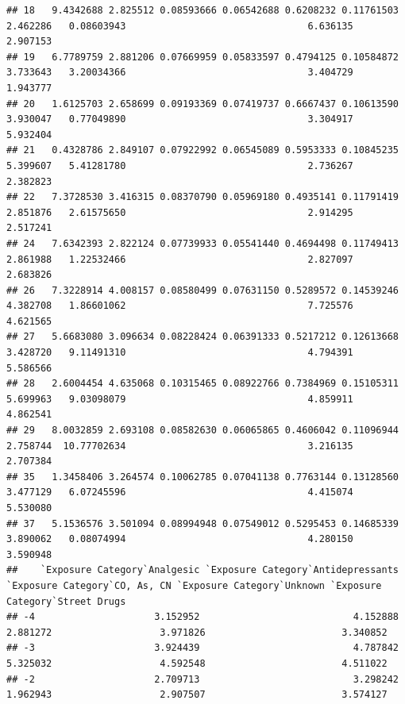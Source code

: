 \documentclass[
]{article}
\begin{document}
\begin{verbatim}
## 18   9.4342688 2.825512 0.08593666 0.06542688 0.6208232 0.11761503                       2.462286   0.08603943                                6.636135       2.907153
## 19   6.7789759 2.881206 0.07669959 0.05833597 0.4794125 0.10584872                       3.733643   3.20034366                                3.404729       1.943777
## 20   1.6125703 2.658699 0.09193369 0.07419737 0.6667437 0.10613590                       3.930047   0.77049890                                3.304917       5.932404
## 21   0.4328786 2.849107 0.07922992 0.06545089 0.5953333 0.10845235                       5.399607   5.41281780                                2.736267       2.382823
## 22   7.3728530 3.416315 0.08370790 0.05969180 0.4935141 0.11791419                       2.851876   2.61575650                                2.914295       2.517241
## 24   7.6342393 2.822124 0.07739933 0.05541440 0.4694498 0.11749413                       2.861988   1.22532466                                2.827097       2.683826
## 26   7.3228914 4.008157 0.08580499 0.07631150 0.5289572 0.14539246                       4.382708   1.86601062                                7.725576       4.621565
## 27   5.6683080 3.096634 0.08228424 0.06391333 0.5217212 0.12613668                       3.428720   9.11491310                                4.794391       5.586566
## 28   2.6004454 4.635068 0.10315465 0.08922766 0.7384969 0.15105311                       5.699963   9.03098079                                4.859911       4.862541
## 29   8.0032859 2.693108 0.08582630 0.06065865 0.4606042 0.11096944                       2.758744  10.77702634                                3.216135       2.707384
## 35   1.3458406 3.264574 0.10062785 0.07041138 0.7763144 0.13128560                       3.477129   6.07245596                                4.415074       5.530080
## 37   5.1536576 3.501094 0.08994948 0.07549012 0.5295453 0.14685339                       3.890062   0.08074994                                4.280150       3.590948
##    `Exposure Category`Analgesic `Exposure Category`Antidepressants `Exposure Category`CO, As, CN `Exposure Category`Unknown `Exposure Category`Street Drugs
## -4                     3.152952                           4.152888                      2.881272                   3.971826                        3.340852
## -3                     3.924439                           4.787842                      5.325032                   4.592548                        4.511022
## -2                     2.709713                           3.298242                      1.962943                   2.907507                        3.574127

\end{verbatim}
\end{document}
